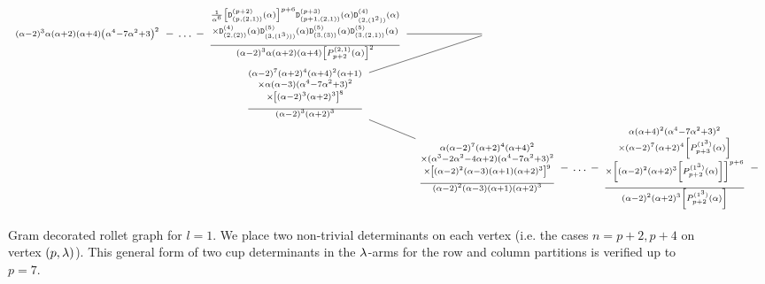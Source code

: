 \begin{landscape}
\begin{figure}
\[\begin{tikzcd}[column sep=0.6em,row sep=0em]
\begin{smallmatrix}
    (\alpha -2)^3 \alpha  (\alpha +2) (\alpha +4) {\left(\alpha ^4-7 \alpha ^2+3\right)^2}
\end{smallmatrix}\ar[dash,r]&\dots\ar[dash,r]&\begin{smallmatrix}
\frac{1}{\a^6}
    \left[\Delttt{(p+2)}{p,(2,1)}(\a)\right]^{p+6}
    \Delttt{(p+3)}{p+1,(2,1)}(\a)\Delttt{(4)}{2,(1^2)}(\a)\\
    \times \Delttt{(4)}{2,(2)}(\a)\Delttt{(5)}{3,(1^3))}(\a)\Delttt{(5)}{3,(3)}(\a)\Delttt{(5)}{3,(2,1)}(\a)\\[0.5em] \hline
    (\a-2)^3\a (\a+2)(\a+4) \left[P^{(2,1)}_{p+2}(\a)\right]^2
\end{smallmatrix}\ar[dash,r]&{}\\
&&\begin{smallmatrix}(\a-2)^{7}(\a+2)^{4}(\a+4)^2(\a+1)\\
\times\a (\a-3){(\a^4-7\a^2+3)^2}\\
\times \left[(\a-2)^3(\a+2)^3\right]^8\\[0.5em] \hline
    (\a-2)^3(\a+2)^3
\end{smallmatrix}\arrow[dash,ur]\arrow[dash,dr]\\
&&&\begin{smallmatrix}\a (\a-2)^{7} (\a+2)^{4}  (\a+4)^2 \\
\times(\a^3-2\a^2-4\a+2){(\a^4-7\a^2+3)^2}\\
\times \left[(\a-2)^2(\a-3 )(\a+1)(\a+2)^3\right]^9 \\[0.5em] \hline
    (\a-2)^2(\a-3 )(\a+1)(\a+2)^3
\end{smallmatrix}\ar[dash,r]&\dots\ar[dash,r]&
    \begin{smallmatrix} \a (\a+4)^2  {(\a^4-7\a^2+3)^2}\\
    \times (\a-2)^7(\a+2)^4 \left[P^{(1^3)}_{p+3}(\a)\right] \\
    \times \left[(\a-2)^2(\a+2 )^3 \left[P^{(1^3)}_{p+2}(\a)\right]\right]^{p+6}\\[0.5em] \hline
        (\a-2)^2(\a+2 )^3\left[ P^{(1^3)}_{p+2}(\a)\right]
    \end{smallmatrix}\ar[dash,r]&{}
\end{tikzcd}\]    
    \caption{Gram decorated rollet graph for $l=1$. We place two non-trivial determinants on each vertex (i.e. the cases $n=p+2,p+4$ on vertex $(p,\lambda)$). This general form of two cup determinants in the $\lambda$-arms for the row and column partitions is verified up to $p=7$.}
\end{figure}
\end{landscape}



